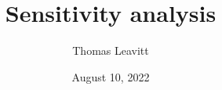 \documentclass[table, xcolor={dvipsnames}, 9pt]{beamer}
\title[]{Sensitivity analysis} %
\author{Thomas Leavitt} %
\institute[] %
{
\medskip
\textit{} %
}
\date{August 10, 2022} %
\theoremstyle{newstyle}
\begin{document}
\begin{frame}
\titlepage %
\end{frame}


\end{document}
